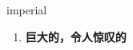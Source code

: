 
\begin{frame}
{\huge imperial}
\begin{center}
\begin{enumerate}\Large
  \item \textbf{巨大的，令人惊叹的}
\end{enumerate}
\end{center}
\end{frame}
